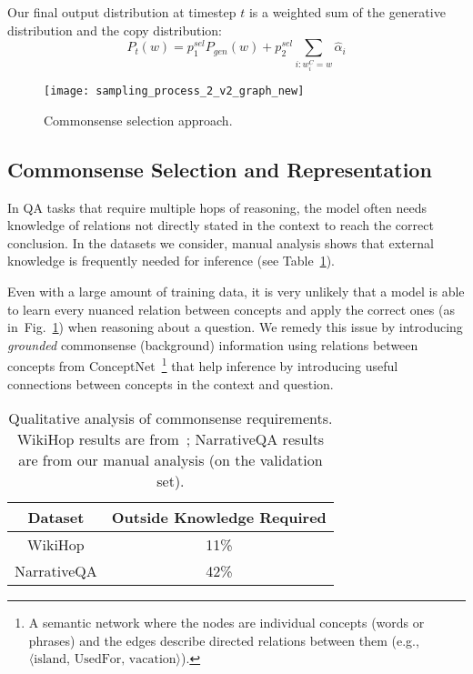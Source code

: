\documentclass[11pt,a4paper]{article}
\def\figref#1{Fig.~\ref{#1}}
\def\tabref#1{Table~\ref{#1}}
\begin{document}
Our final output distribution at timestep $t$ is a weighted sum of the generative distribution and the copy distribution:
\vspace{-3pt}
$$P_t(w) = p^{sel}_1 P_{gen}(w) + p^{sel}_2 \sum_{i: w^C_i = w} \hat \alpha_i $$
\vspace{-15pt} \begin{figure}[t]
\texttt{[image: sampling\_process\_2\_v2\_graph\_new]}
\caption{Commonsense selection approach.
}
\label{sampling_method}
\vspace{-10pt}
\end{figure} 
\subsection{Commonsense Selection and Representation}
\label{sec:commonsense}

In QA tasks that require multiple hops of reasoning, the model often needs knowledge of relations not directly stated in the context to reach the correct conclusion.
In the datasets we consider, manual analysis shows that external knowledge is frequently needed for inference (see \tabref{tab:commonsense_req}). 


Even with a large amount of training data, it is very unlikely that a model is able to learn every nuanced relation between concepts and apply the correct ones (as in~\figref{sampling_method}) when reasoning about a question.
We remedy this issue by introducing {\it grounded} commonsense (background) information using relations between concepts from ConceptNet~\cite{speer2012representing}\footnote
{A semantic network where the nodes are individual concepts (words or phrases) and the edges describe directed relations between them (e.g., $\langle \text{island, UsedFor, vacation} \rangle$).} that help inference by introducing useful connections between concepts in the context and question.



\begin{table}[t]
    \centering
    \begin{small}
    \begin{tabular}{cc}\toprule
    \textbf{Dataset} & \textbf{Outside Knowledge Required} \\
    \midrule
	WikiHop & 11\% \\
    NarrativeQA & 42\% \\
    \bottomrule
    \end{tabular}
    \end{small}
    \caption{Qualitative analysis of commonsense requirements. WikiHop results are from~; NarrativeQA results are from our manual analysis (on the validation set).}
    \label{tab:commonsense_req}
    \vspace{-10pt}
\end{table}
 
\end{document}
